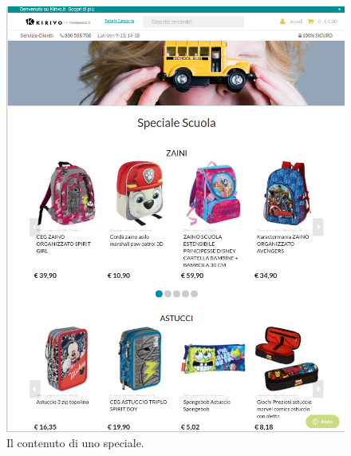 \begin{figure}
  \includegraphics[width=\textwidth]{figure/speciale.png}
  \caption{Il contenuto di uno speciale.}
  \label{fig:spcial}
\end{figure}